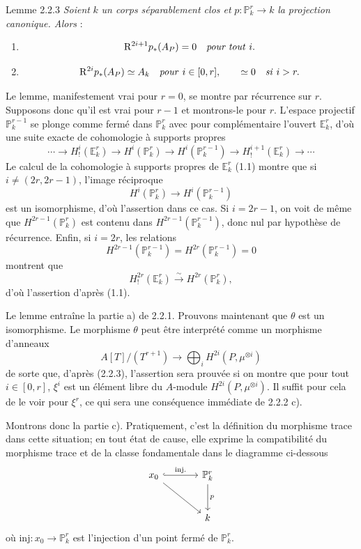 \begin{statement}{Lemme 2.2.3}
\emph{Soient} $k$ \emph{un corps séparablement clos et} $p:\mathbb{P}_k^r\to k$ \emph{la projection canonique. Alors} :
\begin{enumerate}[label=\alph*)]
\item
\[
\mathrm{R}^{2i+1}p_*(A_P)=0\quad\text{\emph{pour tout} }i.
\]
\item
\[
\mathrm{R}^{2i}p_*(A_P)\simeq A_k\quad\text{\emph{pour} }i\in[0,r],
\qquad
\simeq 0\quad\text{\emph{si} }i>r.
\]
\end{enumerate}
\end{statement}

Le lemme, manifestement vrai pour $r=0$, se montre par récurrence sur $r$. Supposons donc qu'il est vrai pour $r-1$ et montrons-le pour $r$. L'espace projectif $\mathbb{P}_k^{r-1}$ se plonge comme fermé dans $\mathbb{P}_k^r$ avec pour complémentaire l'ouvert $\mathbb{E}_k^r$, d'où une suite exacte de cohomologie à supports propres
\[
\cdots\longrightarrow H_!^i(\mathbb{E}_k^r)\longrightarrow H^i(\mathbb{P}_k^r)
\longrightarrow H^i(\mathbb{P}_k^{r-1})\longrightarrow H_!^{i+1}(\mathbb{E}_k^r)\longrightarrow\cdots
\]
Le calcul de la cohomologie à supports propres de $\mathbb{E}_k^r$ (1.1) montre que si $i\ne(2r,2r-1)$, l'image réciproque
\[
H^i(\mathbb{P}_k^r)\longrightarrow H^i(\mathbb{P}_k^{r-1})
\]
est un isomorphisme, d'où l'assertion dans ce cas. Si $i=2r-1$, on voit de même que $H^{2r-1}(\mathbb{P}_k^r)$ est contenu dans $H^{2r-1}(\mathbb{P}_k^{r-1})$, donc nul par hypothèse de récurrence. Enfin, si $i=2r$, les relations
\[
H^{2r-1}(\mathbb{P}_k^{r-1})=H^{2r}(\mathbb{P}_k^{r-1})=0
\]
montrent que
\[
H_!^{2r}(\mathbb{E}_k^r)\xrightarrow{\sim}H^{2r}(\mathbb{P}_k^r),
\]
d'où l'assertion d'après (1.1).

Le lemme entraîne la partie a) de 2.2.1. Prouvons maintenant que $\theta$ est un isomorphisme. Le morphisme $\theta$ peut être interprété comme un morphisme d'anneaux
\[
A[T]/(T^{r+1})\longrightarrow\bigoplus_i H^{2i}(P,\mu^{\otimes i})
\]
de
sorte que, d'après (2.2.3), l'assertion sera prouvée si on montre que pour tout $i\in[0,r]$, $\xi^i$ est un élément libre du $A$-module $H^{2i}(P,\mu^{\otimes i})$. Il suffit pour cela de le voir pour $\xi^r$, ce qui sera une conséquence immédiate de 2.2.2 c).

Montrons donc la partie c). Pratiquement, c'est la définition du morphisme trace dans cette situation; en tout état de cause, elle exprime la compatibilité du morphisme trace et de la classe fondamentale dans le diagramme ci-dessous
\[
\begin{tikzcd}[column sep=large,row sep=large]
x_0 \arrow[r,hook,"\mathrm{inj.}"] \arrow[dr] & \mathbb{P}^r_k \arrow[d,"p"]\\
& k
\end{tikzcd}
\]
où $\mathrm{inj}:x_0\to \mathbb{P}^r_k$ est l'injection d'un point fermé de $\mathbb{P}^r_k$.


